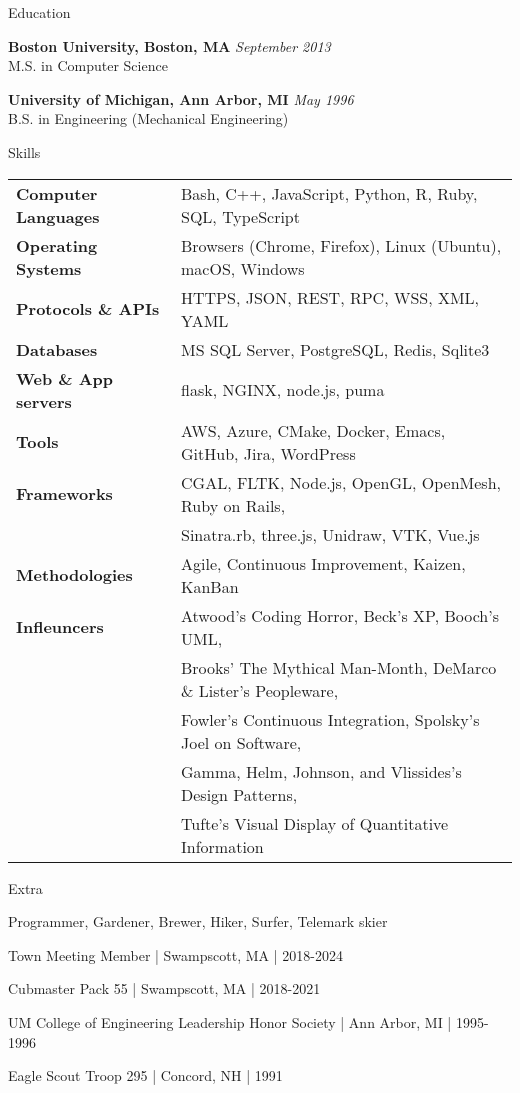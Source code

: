 \documentclass{resume}
\begin{document}
\begin{rSection}{Education}

\item {\bf Boston University, Boston, MA} \hfill {\em September 2013} \\
M.S. in Computer Science

\item {\bf University of Michigan, Ann Arbor, MI} \hfill {\em May 1996} \\
B.S. in Engineering (Mechanical Engineering)

\end{rSection}


\begin{rSection}{Skills}
\begin{tabular}{ @{} >{\bfseries}l @{\hspace{6ex}} l }
Computer Languages & Bash, C++, JavaScript, Python, R, Ruby, SQL, TypeScript \\
Operating Systems & Browsers (Chrome, Firefox), Linux (Ubuntu), macOS, Windows \\
Protocols \& APIs & HTTPS, JSON, REST, RPC, WSS, XML, YAML \\
Databases & MS SQL Server, PostgreSQL, Redis, Sqlite3 \\
Web \& App servers & flask, NGINX, node.js, puma \\
Tools & AWS, Azure, CMake, Docker, Emacs, GitHub, Jira, WordPress \\
Frameworks & CGAL, FLTK, Node.js, OpenGL, OpenMesh, Ruby on Rails, \\
 & Sinatra.rb, three.js, Unidraw, VTK, Vue.js \\
Methodologies & Agile, Continuous Improvement, Kaizen, KanBan \\
Infleuncers & Atwood's Coding Horror, Beck's XP, Booch's UML, \\
 & Brooks' The Mythical Man-Month, DeMarco \& Lister's Peopleware, \\
 & Fowler's Continuous Integration, Spolsky's Joel on Software, \\
 & Gamma, Helm, Johnson, and Vlissides's Design Patterns, \\
 & Tufte's Visual Display of Quantitative Information
\end{tabular}
\end{rSection}

\begin{rSection}{Extra}
\item Programmer, Gardener, Brewer, Hiker, Surfer, Telemark skier
\item Town Meeting Member | Swampscott, MA | 2018-2024
\item Cubmaster Pack 55 | Swampscott, MA | 2018-2021
\item UM College of Engineering Leadership Honor Society | Ann Arbor, MI | 1995-1996
\item Eagle Scout Troop 295 | Concord, NH | 1991
\end{rSection}
\end{document}
